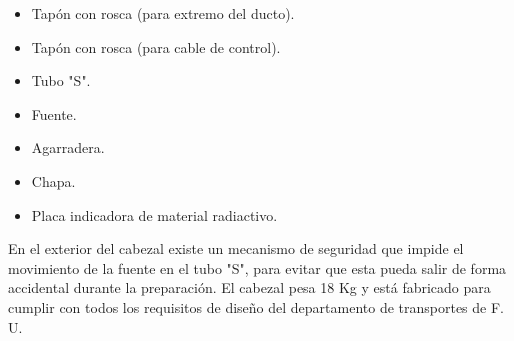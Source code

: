 
\begin{itemize}
    \item[a)] Tapón con rosca (para extremo del ducto).
    \item[b)] Tapón con rosca (para cable de control).
    \item[c)] Tubo "S".
    \item[d)] Fuente.
    \item[e)] Agarradera.
    \item[f)] Chapa.
    \item[g)] Placa indicadora de material radiactivo.
\end{itemize}

En el exterior del cabezal existe un mecanismo de seguridad que impide el movimiento de la fuente en el tubo "S", para evitar que esta pueda salir de forma accidental durante la preparación. El cabezal pesa 18 Kg y está fabricado para cumplir con todos los requisitos de diseño del departamento de transportes de F. U.
